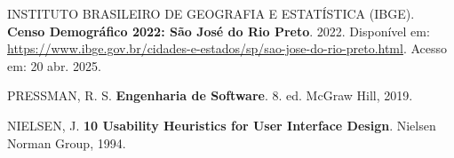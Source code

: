 \documentclass[a5paper, 12pt]{article}
\begin{document}
\begin{thebibliography}{09}
 INSTITUTO BRASILEIRO DE GEOGRAFIA E ESTATÍSTICA (IBGE). 
\textbf{Censo Demográfico 2022: São José do Rio Preto}. 
2022. 
Disponível em: \url{https://www.ibge.gov.br/cidades-e-estados/sp/sao-jose-do-rio-preto.html}. 
Acesso em: 20 abr. 2025.

 PRESSMAN, R. S. 
\textbf{Engenharia de Software}. 
8. ed. McGraw Hill, 2019.

 NIELSEN, J. 
\textbf{10 Usability Heuristics for User Interface Design}. 
Nielsen Norman Group, 1994.
\end{thebibliography}
\end{document}
